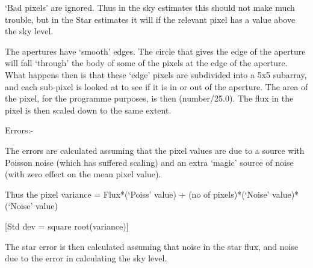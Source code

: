 {{   `Bad pixels' are ignored. Thus in the sky estimates this should
   not make much trouble, but in the Star estimates it will if the
   relevant pixel has a value above the sky level.
                                                                               
   The apertures have `smooth' edges. The circle that gives the
   edge of the aperture will fall `through' the body of some of the
   pixels at the edge of the aperture. What happens then is that these
   `edge' pixels are subdivided into a 5x5 subarray, and each sub-pixel
   is looked at to see if it is in or out of the aperture. The area of
   the pixel, for the programme purposes, is then (number/25.0). The
   flux in the pixel is then scaled down to the same extent.
                                                                               
   Errors:-
                                                                               
   The errors are calculated assuming that the pixel values are due
   to a source with Poisson noise (which has suffered scaling) and
   an extra `magic' source of noise (with zero effect on the mean
   pixel value).

   Thus the pixel variance = Flux*(`Poiss' value) +
                          (no of pixels)*(`Noise' value)*(`Noise' value)
                                                                               
   [Std dev = square root(variance)]
                                                                               
   The star error is then calculated assuming that noise in the star
   flux, and noise due to the error in calculating the sky level.
                                                                               
}}

